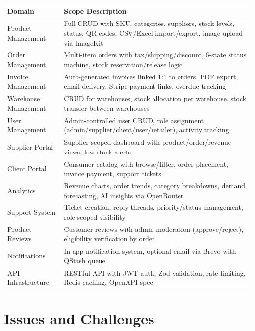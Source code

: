 \documentclass[12pt,a4paper]{report}
\begin{document}
\begin{center}
\begin{tabularx}{\textwidth}{lX}
  \toprule
  \textbf{Domain} & \textbf{Scope Description} \\
  \midrule
  Product Management    & Full CRUD with SKU, categories, suppliers, stock levels, status, QR codes, CSV/Excel import/export, image upload via ImageKit \\
  Order Management      & Multi-item orders with tax/shipping/discount, 6-state status machine, stock reservation/release logic \\
  Invoice Management    & Auto-generated invoices linked 1:1 to orders, PDF export, email delivery, Stripe payment links, overdue tracking \\
  Warehouse Management  & CRUD for warehouses, stock allocation per warehouse, stock transfer between warehouses \\
  User Management       & Admin-controlled user CRUD, role assignment (admin/supplier/client/user/retailer), activity tracking \\
  Supplier Portal       & Supplier-scoped dashboard with product/order/revenue views, low-stock alerts \\
  Client Portal         & Consumer catalog with browse/filter, order placement, invoice payment, support tickets \\
  Analytics             & Revenue charts, order trends, category breakdowns, demand forecasting, AI insights via OpenRouter \\
  Support System        & Ticket creation, reply threads, priority/status management, role-scoped visibility \\
  Product Reviews       & Customer reviews with admin moderation (approve/reject), eligibility verification by order \\
  Notifications         & In-app notification system, optional email via Brevo with QStash queue \\
  API Infrastructure    & RESTful API with JWT auth, Zod validation, rate limiting, Redis caching, OpenAPI spec \\
  \bottomrule
\end{tabularx}
\end{center}

\section{Issues and Challenges}
\end{document}
